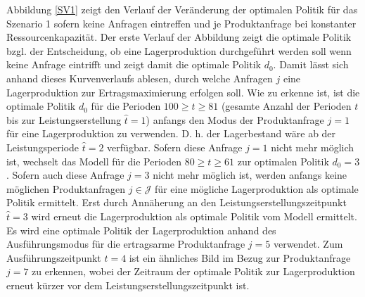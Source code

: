 Abbildung \ref{SV1} zeigt den Verlauf der Veränderung der optimalen Politik für das Szenario 1 sofern keine Anfragen eintreffen und je Produktanfrage bei konstanter Ressourcenkapazität. Der erste Verlauf der Abbildung zeigt die optimale Politik bzgl. der Entscheidung, ob eine Lagerproduktion durchgeführt werden soll wenn keine Anfrage eintrifft und zeigt damit die optimale Politik $d_0$. Damit lässt sich anhand dieses Kurvenverlaufs ablesen, durch welche Anfragen $j$ eine Lagerproduktion zur Ertragsmaximierung erfolgen soll. Wie zu erkenne ist, ist die optimale Politik $d_0$ für die Perioden $100\ge t \ge 81$ (gesamte Anzahl der Perioden $t$ bis zur Leistungserstellung $\hat t = 1$) anfangs den Modus der Produktanfrage $j=1$ für eine Lagerproduktion zu verwenden. D. h. der Lagerbestand wäre ab der Leistungsperiode $\hat t=2$ verfügbar. Sofern diese Anfrage $j=1$ nicht mehr möglich ist, wechselt das Modell für die Perioden $80\ge t \ge 61$ zur optimalen Politik $d_0=3$. Sofern auch diese Anfrage $j=3$ nicht mehr möglich ist, werden anfangs keine möglichen Produktanfragen $j\in\mathcal{J}$ für eine mögliche Lagerproduktion als optimale Politik ermittelt. Erst durch Annäherung an den Leistungserstellungszeitpunkt $\hat t = 3$ wird erneut die Lagerproduktion als optimale Politik vom Modell ermittelt. Es wird eine optimale Politik der Lagerproduktion anhand des Ausführungsmodus für die ertragsarme Produktanfrage $j=5$ verwendet. Zum Ausführungszeitpunkt $\hat t = 4$ ist ein ähnliches Bild im Bezug zur Produktanfrage $j=7$ zu erkennen, wobei der Zeitraum der optimale Politik zur Lagerproduktion erneut kürzer vor dem Leistungserstellungszeitpunkt ist.

